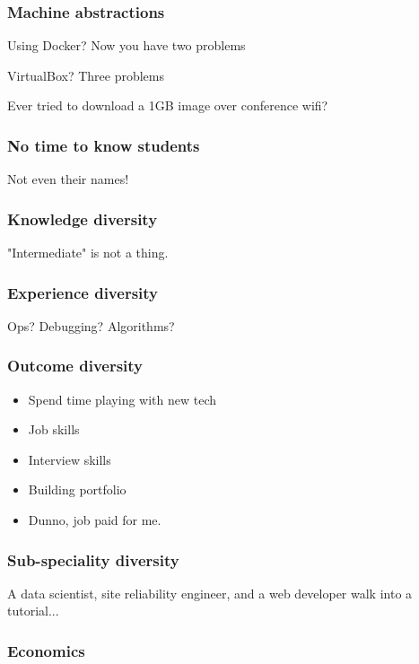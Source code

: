 \begin{frame}
\frametitle{Machine abstractions}

\begin{frame}
\item Using Docker? Now you have two problems
\item VirtualBox? Three problems
\item Ever tried to download a 1GB image over conference wifi?
\end{frame}

\end{frame}

\begin{frame}
\frametitle{No time to know students}

Not even their names!
\end{frame}

\begin{frame}
\frametitle{Knowledge diversity}

"Intermediate" is not a thing.

\end{frame}

\begin{frame}
\frametitle{Experience diversity}

Ops? Debugging? Algorithms?

\end{frame}


\begin{frame}
\frametitle{Outcome diversity}

\begin{itemize}
\item Spend time playing with new tech
\item Job skills
\item Interview skills
\item Building portfolio
\item Dunno, job paid for me.
\end{itemize}

\end{frame}

\begin{frame}
\frametitle{Sub-speciality diversity}

A data scientist, site reliability engineer,
and a web developer walk into a tutorial...

\end{frame}

\begin{frame}
\frametitle{Economics}


\end{frame}

